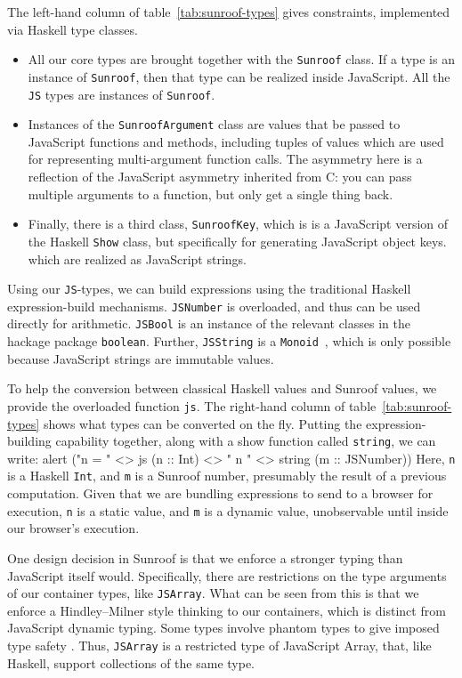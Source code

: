 \documentclass{llncs}
\newcommand{\Src}[1]{{\tt{#1}}}
\newenvironment{Code}{\verbatim}{\endverbatim}
\begin{document}
The left-hand column of table~\ref{tab:sunroof-types} gives constraints,
implemented via Haskell type classes.
\begin{itemize}
\item  All our core types are brought together with the \Src{Sunroof} class.
If a type is an instance of \Src{Sunroof}, then that type can be realized inside JavaScript.
All the \Src{JS} types are instances of \Src{Sunroof}.

\item Instances of the \Src{SunroofArgument} class
are values that be passed to JavaScript functions and methods,
including tuples of values which are used for representing multi-argument 
function calls.
The asymmetry here is a reflection of the JavaScript
asymmetry inherited from C: you can pass multiple arguments
to a function, but only get a single thing back.

\item Finally, there is a third class, \Src{SunroofKey}, which is
is a JavaScript version of the Haskell \Src{Show} class,
but specifically for generating JavaScript object keys.
which are realized as JavaScript strings.
\end{itemize}

Using our \Src{JS}-types, we can build expressions using the traditional Haskell expression-build
mechanisms. \Src{JSNumber} is overloaded, and thus can be used directly for arithmetic.
\Src{JSBool} is an instance of the relevant classes in the hackage package \verb|boolean|.
Further, \Src{JSString} is a \Src{Monoid}~\cite{..}, which is only possible because JavaScript
strings are immutable values.

To help the conversion between classical Haskell values and Sunroof values,
we provide the overloaded function \Src{js}. The right-hand column of 
table~\ref{tab:sunroof-types} shows what types can be converted on the fly.
Putting the expression-building capability together, 
along with a show function called \Src{string}, we can write:
\begin{Code}
alert ("n =  " <> js (n :: Int) <> " n " <> string (m :: JSNumber))
\end{Code}
Here, \Src{n} is a Haskell \Src{Int}, and \Src{m} is a Sunroof number,
presumably the result of a previous computation. Given that we are 
bundling expressions to send to a browser for execution, \Src{n}
is a static value, and \Src{m} is a dynamic value, unobservable until inside our browser's execution.

One design decision in Sunroof is that we enforce a stronger typing than JavaScript itself would.
Specifically, there are restrictions on the type arguments of our container types,
like \Src{JSArray}. What can be seen from this is that we
enforce a Hindley–Milner style thinking to our containers,
which is distinct from JavaScript dynamic typing.
Some types involve
phantom types to give imposed type safety \cite{Cheney:03:FirstClassPhantomTypes}.
Thus, \Src{JSArray} is a restricted type of JavaScript Array, that, like Haskell,
support collections of the same type.
\end{document}
